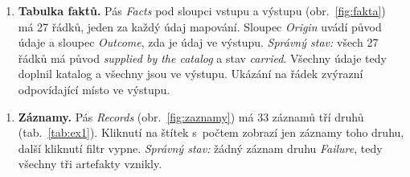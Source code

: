\clearpage

\begin{enumerate}[resume,leftmargin=*,itemsep=2pt]
\item \textbf{Tabulka faktů.} Pás \emph{Facts} pod sloupci vstupu a výstupu (obr.~\ref{fig:fakta}) má 27 řádků, jeden za každý údaj mapování. Sloupec \emph{Origin} uvádí původ údaje a sloupec \emph{Outcome}, zda je údaj ve výstupu. \emph{Správný stav:} všech 27 řádků má původ \emph{supplied by the catalog} a stav \emph{carried}. Všechny údaje tedy doplnil katalog a všechny jsou ve výstupu. Ukázání na řádek zvýrazní odpovídající místo ve výstupu.
\end{enumerate}


\begin{enumerate}[resume,leftmargin=*,itemsep=2pt]
\item \textbf{Záznamy.} Pás \emph{Records} (obr.~\ref{fig:zaznamy}) má 33 záznamů tří druhů (tab.~\ref{tab:ex1}). Kliknutí na štítek s~počtem zobrazí jen záznamy toho druhu, další kliknutí filtr vypne. \emph{Správný stav:} žádný záznam druhu \emph{Failure}, tedy všechny tři artefakty vznikly.

\nopagebreak
{}
\end{enumerate}

